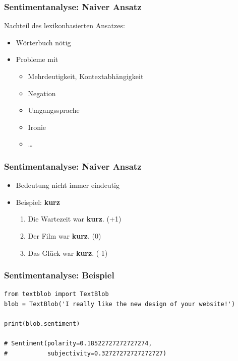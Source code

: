 
\begin{frame}
\frametitle{Sentimentanalyse: Naiver Ansatz}

Nachteil des lexikonbasierten Ansatzes:
\begin{itemize}
	\item Wörterbuch nötig
	\item Probleme mit \begin{itemize}
		\item Mehrdeutigkeit, Kontextabhängigkeit
		\item Negation
		\item Umgangssprache
		\item Ironie
		\item \dots
	\end{itemize}
\end{itemize}
\end{frame}


\begin{frame}
\frametitle{Sentimentanalyse: Naiver Ansatz}

\begin{itemize}
    \item Bedeutung nicht immer eindeutig
\item Beispiel: \textbf{kurz}
\begin{enumerate}
	\item Die Wartezeit war \textbf{kurz}. (+1)
	\item Der Film war \textbf{kurz}. (0)
	\item Das Glück war \textbf{kurz}. (-1)
\end{enumerate}
\end{itemize}
\end{frame}



\begin{frame}[fragile]
    \frametitle{Sentimentanalyse: Beispiel}

\begin{verbatim}
from textblob import TextBlob    
blob = TextBlob('I really like the new design of your website!')

print(blob.sentiment)

# Sentiment(polarity=0.18522727272727274, 
#           subjectivity=0.32727272727272727)
\end{verbatim}

\end{frame}    

